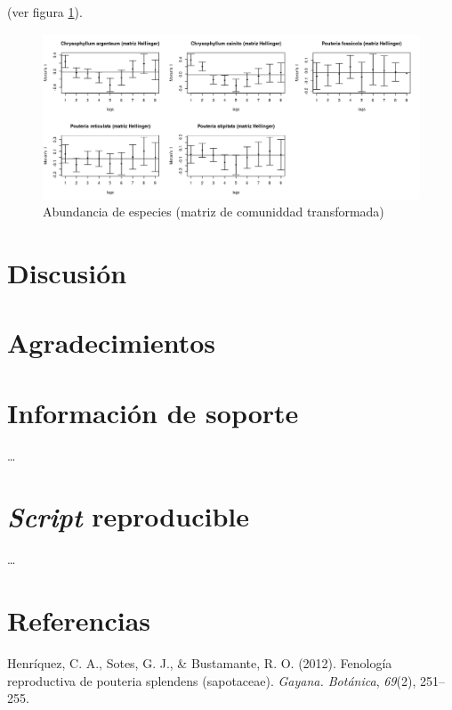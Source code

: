 \documentclass[11pt,]{article}
\begin{document}
(ver figura \ref{fig:PCoA _promedios_especies}).

\begin{figure}
\centering
\includegraphics[width=1.00000\textwidth]{especies_ecologia_espacial.png}
\caption{Abundancia de especies (matriz de comuniddad transformada)
\label{fig:PCoA _promedios_especies}}
\end{figure}

\section{Discusión}\label{discusiuxf3n}

\section{Agradecimientos}\label{agradecimientos}

\section{Información de soporte}\label{informaciuxf3n-de-soporte}

\ldots

\section{\texorpdfstring{\emph{Script}
reproducible}{Script reproducible}}\label{script-reproducible}

\ldots

\section*{Referencias}\label{referencias}

\hypertarget{refs}{}
\hypertarget{ref-henriquez2012fenologia}{}
Henríquez, C. A., Sotes, G. J., \& Bustamante, R. O. (2012). Fenología
reproductiva de pouteria splendens (sapotaceae). \emph{Gayana.
Botánica}, \emph{69}(2), 251--255.
\end{document}
